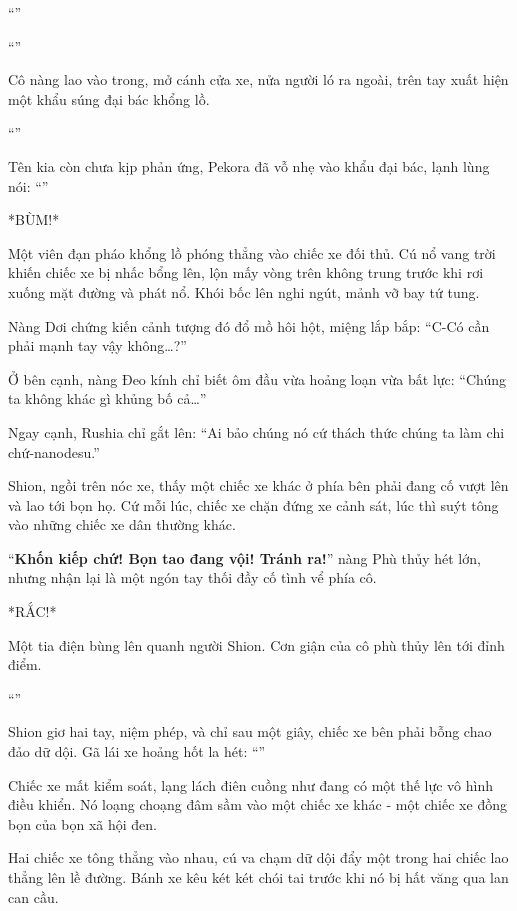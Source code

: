 \documentclass[../main.tex]{subfiles}
\begin{document}
``''

``''

Cô nàng lao vào trong, mở cánh cửa xe, nửa người ló ra ngoài, trên tay xuất hiện một khẩu súng đại bác khổng lồ.

``''

Tên kia còn chưa kịp phản ứng, Pekora đã vỗ nhẹ vào khẩu đại bác, lạnh lùng nói: ``''

*BÙM!*

Một viên đạn pháo khổng lồ phóng thẳng vào chiếc xe đối thủ. Cú nổ vang trời khiến chiếc xe bị nhấc bổng lên, lộn mấy vòng trên không trung trước khi rơi xuống mặt đường và phát nổ. Khói bốc lên nghi ngút, mảnh vỡ bay tứ tung.

Nàng Dơi chứng kiến cảnh tượng đó đổ mồ hôi hột, miệng lắp bắp: ``C-Có cần phải mạnh tay vậy không\dots?''

Ở bên cạnh, nàng Đeo kính chỉ biết ôm đầu vừa hoảng loạn vừa bất lực: ``Chúng ta không khác gì khủng bố cả\dots''

Ngay cạnh, Rushia chỉ gắt lên: ``Ai bảo chúng nó cứ thách thức chúng ta làm chi chứ-nanodesu.''

Shion, ngồi trên nóc xe, thấy một chiếc xe khác ở phía bên phải đang cố vượt lên và lao tới bọn họ. Cứ mỗi lúc, chiếc xe chặn đứng xe cảnh sát, lúc thì suýt tông vào những chiếc xe dân thường khác.

``\textbf{Khốn kiếp chứ! Bọn tao đang vội! Tránh ra!}'' nàng Phù thủy hét lớn, nhưng nhận lại là một ngón tay thối đầy cố tình vể phía cô.

*RẮC!*

Một tia điện bùng lên quanh người Shion. Cơn giận của cô phù thủy lên tới đỉnh điểm.

``''

Shion giơ hai tay, niệm phép, và chỉ sau một giây, chiếc xe bên phải bỗng chao đảo dữ dội. Gã lái xe hoảng hốt la hét: ``''

Chiếc xe mất kiểm soát, lạng lách điên cuồng như đang có một thế lực vô hình điều khiển. Nó loạng choạng đâm sầm vào một chiếc xe khác - một chiếc xe đồng bọn của bọn xã hội đen.

Hai chiếc xe tông thẳng vào nhau, cú va chạm dữ dội đẩy một trong hai chiếc lao thẳng lên lề đường. Bánh xe kêu két két chói tai trước khi nó bị hất văng qua lan can cầu.
\end{document}
